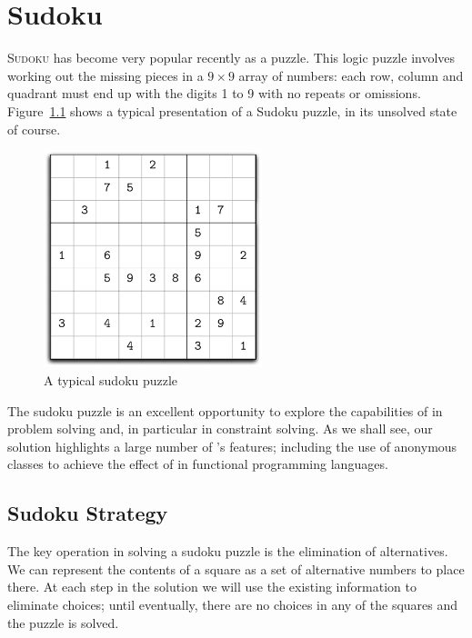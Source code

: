 \chapter{Sudoku}
\label{sudoku}
\lettrine[nindent=0.1em]{S}{udoku} has become very popular recently as a puzzle. This logic puzzle involves working out the missing pieces in a $9\times{}9$ array of numbers: each row, column and quadrant must end up with the digits 1 to 9 with no repeats or omissions. Figure~\ref{su:unsolved} shows a typical presentation of a Sudoku puzzle, in its unsolved state of course.

\begin{figure}[h]
\centering
\includegraphics[width=2.5in]{unsolved}
\caption{\label{su:unsolved}A typical sudoku puzzle}
\end{figure}

\noindent
The sudoku puzzle is an excellent opportunity to explore the capabilities of \go in problem solving and, in particular in constraint solving. As we shall see, our solution highlights a large number of \go's features; including the use of anonymous classes to achieve the effect of  in functional programming languages.

\section{Sudoku Strategy}
\label{su:strategy}

The key operation in solving a sudoku puzzle is the elimination of alternatives. We can represent the contents of a square as a set of alternative numbers to place there. At each step in the solution we will use the existing information to eliminate choices; until eventually, there are no choices in any of the squares and the puzzle is solved.

